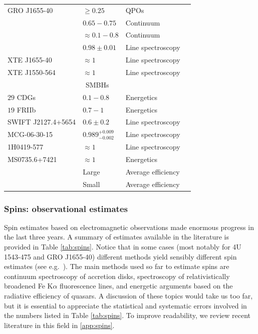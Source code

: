 \documentclass[]{iopart}
\begin{document}
\begin{table}[ht]
\begin{tabular}{llll}
GRO J1655-40       & $\geq 0.25$   & QPOs & \cite{Strohmayer:2001yn} \\
                   & $0.65-0.75$   & Continuum & \cite{Zhang:1997dy,Shafee:2005ef} \\
                   & $\approx 0.1-0.8$     & Continuum & \cite{Davis:2006cm} \\
                   & $0.98\pm 0.01$   & Line spectroscopy &\cite{Miller:2009cw}\\%
XTE J1655-40       & $\approx 1$   & Line spectroscopy & \cite{Miller:2004cg}\\
XTE J1550-564      & $\approx 1$   & Line spectroscopy & \cite{Miller:2004cg}\\
\hline
\hline
\multicolumn{4}{c}{SMBHs}\\ 
$29$ CDGs  & $0.1-0.8$ & Energetics & \cite{Daly:2009ih}\\
$19$ FRIIb & $0.7-1$ & Energetics & \cite{Daly:2009ih}\\
SWIFT J2127.4+5654 & $0.6\pm 0.2$  & Line spectroscopy & \cite{Miniutti:2009dg}\\
MCG-06-30-15  & $0.989^{+0.009}_{-0.002}$ & Line spectroscopy & \cite{Brenneman:2006hw}\\
1H0419-577    & $\approx 1$   & Line spectroscopy & \cite{Fabian:2005qj} \\
MS0735.6+7421 & $\approx 1$   & Energetics & \cite{McNamara:2008dy}\\
              & Large & Average efficiency & \cite{Elvis:2001bn,Yu:2002sq,Wang:2006bz,Wang:2008ms,Cao:2008pd}\\
              & Small & Average efficiency & \cite{Shankar:2007zg,Merloni:2008hx,Daly:2008zk,Wang:2009ws}\\
\hline
\hline
\end{tabular}
\end{table}

\subsubsection*{Spins: observational estimates} 

Spin estimates based on electromagnetic observations made enormous progress in
the last three years. A summary of estimates available in the literature is
provided in Table \ref{tab:spins}. Notice that in some cases (most notably for
4U 1543-475 and GRO J1655-40) different methods yield sensibly different spin
estimates (see e.g.~\cite{Miller:2009cw}).  The main methods used so far to
estimate spins are continuum spectroscopy of accretion disks, spectroscopy of
relativistically broadened Fe K$\alpha$ fluorescence lines, and energetic
arguments based on the radiative efficiency of quasars. A discussion of these
topics would take us too far, but it is essential to appreciate the
statistical and systematic errors involved in the numbers listed in Table
\ref{tab:spins}. To improve readability, we review recent literature in this
field in \ref{app:spins}.
\end{document}
